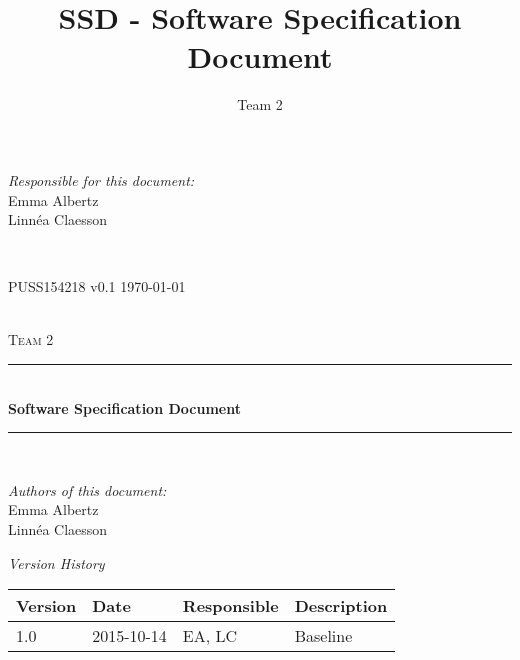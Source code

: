 \documentclass[a4paper]{article}
\title{SSD - Software Specification Document}
\author{Team 2}
\begin{document}
\begin{titlepage}
\newcommand{\HRule}{\rule{\linewidth}{0.5mm}}

\begin{minipage}{0.5\textwidth}
\begin{flushleft} %
\textit{Responsible for this document:}\\
Emma Albertz \\
Linnéa Claesson
\end{flushleft}
\end{minipage}
~
\begin{minipage}{0.4\textwidth}
\begin{flushright}
PUSS154218 v0.1 
\today
\end{flushright}
\end{minipage}\\[3cm]

\centering
\textsc{\LARGE Team 2}\\[0.5cm]

\HRule \\[0.4cm]
{ \huge \bfseries Software Specification Document}\\[0.4cm] %
\HRule \\[1.5cm]

\vfill
\begin{flushleft}
\textit{Authors of this document:}\\
Emma Albertz \\
Linnéa Claesson
\end{flushleft}



\end{titlepage}



\begin{center}
\textit{\large Version History}

    \begin{tabular}{ | l | l | l | p{5cm} |}
    \hline
    \textbf{Version} & \textbf{Date} & \textbf{Responsible} & \textbf{Description} \\ \hline
    1.0 & 2015-10-14 & EA, LC & Baseline\\ \hline
    \end{tabular}
\end{center}



\setcounter{tocdepth}{2}
\tableofcontents
\newpage
{}
\end{document}
